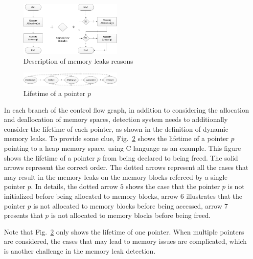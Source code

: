 \begin{figure}[!h]
\center
\includegraphics[width=0.45\textwidth]{figure/fig1-fig4/fig1}
\caption{Description of memory leaks reasons}
\label{fig:1}
\end{figure}

\begin{figure}[!h]
\center
\includegraphics[width=0.45\textwidth]{figure/fig1-fig4/fig2}
\caption{Lifetime of a pointer $p$}
\label{fig:2}
\end{figure}

In each branch of the control flow graph, in addition to considering the allocation and deallocation of memory spaces, detection system needs to additionally consider the lifetime of each pointer, as shown in the definition of dynamic memory leaks. To provide some clue, Fig.~\ref{fig:2} shows the lifetime of a pointer $p$ pointing to a heap memory space, using C language as an example. This figure shows the lifetime of a pointer $p$ from being declared to being freed. The solid arrows represent the correct order. The dotted arrows represent all the cases that may result in the memory leaks on the memory blocks refereed by a single pointer $p$. In details, the dotted arrow $5$ shows the case that the pointer $p$ is not initialized before being allocated to memory blocks, arrow $6$ illustrates that the pointer $p$ is not allocated to memory blocks before being accessed, arrow $7$ presents that $p$ is not allocated to memory blocks before being freed.

Note that Fig.~\ref{fig:2} only shows the lifetime of one pointer. When multiple pointers are considered, the cases that may lead to memory issues are complicated, which is another challenge in the memory leak detection.
